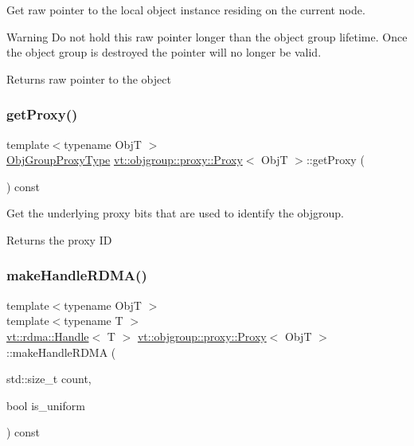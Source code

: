 Get raw pointer to the local object instance residing on the current node. 

\begin{DoxyWarning}{Warning}
Do not hold this raw pointer longer than the object group lifetime. Once the object group is destroyed the pointer will no longer be valid.
\end{DoxyWarning}
\begin{DoxyReturn}{Returns}
raw pointer to the object 
\end{DoxyReturn}
\mbox{\label{structvt_1_1objgroup_1_1proxy_1_1_proxy_a76cda2351cf7801abe2ebffa1403c5b8}} 
\subsubsection{\texorpdfstring{get\+Proxy()}{getProxy()}}
{\footnotesize\ttfamily template$<$typename ObjT $>$ \\
\hyperlink{namespacevt_ad7cae989df485fccca57f0792a880a8e}{Obj\+Group\+Proxy\+Type} \hyperlink{structvt_1_1objgroup_1_1proxy_1_1_proxy}{vt\+::objgroup\+::proxy\+::\+Proxy}$<$ ObjT $>$\+::get\+Proxy (\begin{DoxyParamCaption}{ }\end{DoxyParamCaption}) const}



Get the underlying proxy bits that are used to identify the objgroup. 

\begin{DoxyReturn}{Returns}
the proxy ID 
\end{DoxyReturn}
\mbox{\label{structvt_1_1objgroup_1_1proxy_1_1_proxy_a205119186cc6b5a37d91df8eaac0500f}} 
\subsubsection{\texorpdfstring{make\+Handle\+R\+D\+M\+A()}{makeHandleRDMA()}}
{\footnotesize\ttfamily template$<$typename ObjT $>$ \\
template$<$typename T $>$ \\
\hyperlink{structvt_1_1rdma_1_1_handle}{vt\+::rdma\+::\+Handle}$<$ T $>$ \hyperlink{structvt_1_1objgroup_1_1proxy_1_1_proxy}{vt\+::objgroup\+::proxy\+::\+Proxy}$<$ ObjT $>$\+::make\+Handle\+R\+D\+MA (\begin{DoxyParamCaption}\item[{std\+::size\+\_\+t}]{count,  }\item[{bool}]{is\+\_\+uniform }\end{DoxyParamCaption}) const}



